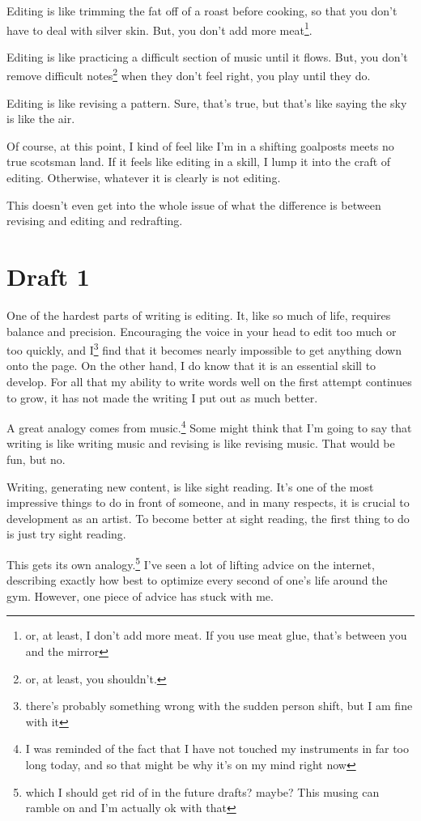 \documentclass[12pt]{article}[titlepage]
\newcommand{\1}{\={a}}
\newcommand{\2}{\={e}}
\newcommand{\3}{\={\i}}
\newcommand{\4}{\=o}
\newcommand{\5}{\=u}
\newcommand{\6}{\={A}}
\renewcommand{\,}{\textsuperscript{,}}
\begin{document}
Editing is like trimming the fat off of a roast before cooking, so that you don't have to deal with silver skin.
But, you don't add more meat\footnote{or, at least, I don't add more meat. If you use meat glue, that's between you and the mirror}.

Editing is like practicing a difficult section of music until it flows.
But, you don't remove difficult notes\footnote{or, at least, you shouldn't.} when they don't feel right, you play until they do.

Editing is like revising a pattern.
Sure, that's true, but that's like saying the sky is like the air.

Of course, at this point, I kind of feel like I'm in a shifting goalposts meets no true scotsman land.
If it feels like editing in a skill, I lump it into the craft of editing.
Otherwise, whatever it is clearly is not editing.

This doesn't even get into the whole issue of what the difference is between revising and editing and redrafting.
\section{Draft 1}
One of the hardest parts of writing is editing.
It, like so much of life, requires balance and precision.
Encouraging the voice in your head to edit too much or too quickly, and I\footnote{there's probably something wrong with the sudden person shift, but I am fine with it} find that it becomes nearly impossible to get anything down onto the page.
On the other hand, I do know that it is an essential skill to develop.
For all that my ability to write words well on the first attempt continues to grow, it has not made the writing I put out as much better.

A great analogy comes from music.\footnote{I was reminded of the fact that I have not touched my instruments in far too long today, and so that might be why it's on my mind right now}
Some might think that I'm going to say that writing is like writing music and revising is like revising music.
That would be fun, but no.

Writing, generating new content, is like sight reading.
It's one of the most impressive things to do in front of someone, and in many respects, it is crucial to development as an artist.
To become better at sight reading, the first thing to do is just try sight reading.

This gets its own analogy.\footnote{which I should get rid of in the future drafts? maybe? This musing can ramble on and I'm actually ok with that}
I've seen a lot of lifting advice on the internet, describing exactly how best to optimize every second of one's life around the gym.
However, one piece of advice has stuck with me.
\end{document}
